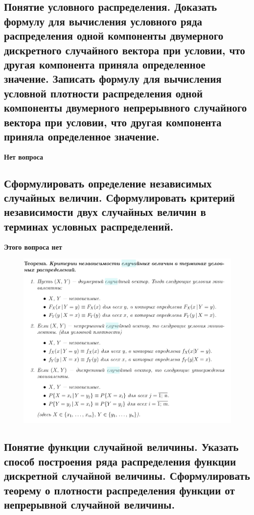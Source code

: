 \subsection{Понятие условного распределения. Доказать формулу для вычисления условного ряда распределения одной компоненты двумерного дискретного случайного вектора при условии, что другая компонента приняла определенное значение. Записать формулу для вычисления условной плотности распределения одной компоненты двумерного непрерывного случайного вектора при условии, что другая компонента приняла определенное значение.}

\textbf{Нет вопроса}

\subsection{Сформулировать определение независимых случайных величин. Сформулировать критерий независимости двух случайных величин в терминах условных распределений.}

\textbf{Этого вопроса нет}


\begin{figure}[ht!]
	\centering
	\includegraphics[width=0.9\linewidth]{assets/amosus.png}
\end{figure}
\FloatBarrier


\subsection{Понятие функции случайной величины. Указать способ построения ряда распределения функции дискретной случайной величины. Сформулировать теорему о плотности распределения функции от непрерывной случайной величины.}

